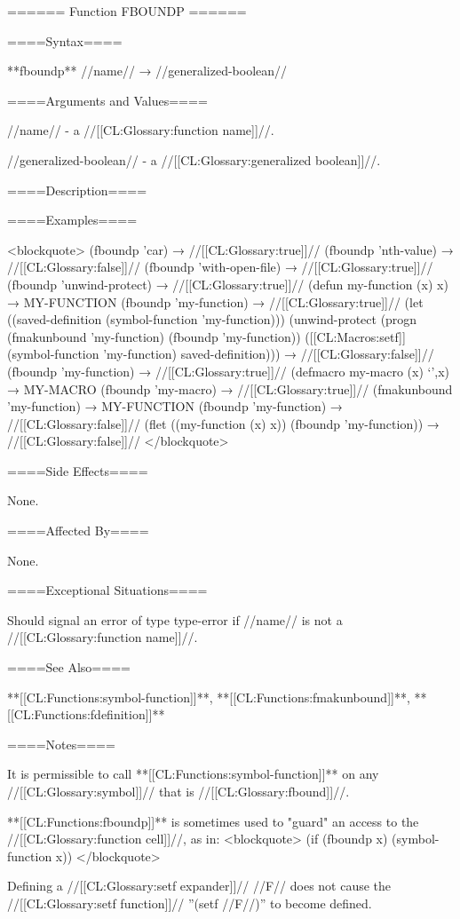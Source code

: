 ====== Function FBOUNDP ======

====Syntax====

**fboundp** //name// → //generalized-boolean//


====Arguments and Values====

//name// - a //[[CL:Glossary:function name]]//.

//generalized-boolean// - a //[[CL:Glossary:generalized boolean]]//.

====Description====


====Examples====

<blockquote> (fboundp 'car) → //[[CL:Glossary:true]]// (fboundp 'nth-value) → //[[CL:Glossary:false]]// (fboundp 'with-open-file) → //[[CL:Glossary:true]]// (fboundp 'unwind-protect) → //[[CL:Glossary:true]]// (defun my-function (x) x) → MY-FUNCTION (fboundp 'my-function) → //[[CL:Glossary:true]]// (let ((saved-definition (symbol-function 'my-function))) (unwind-protect (progn (fmakunbound 'my-function) (fboundp 'my-function)) ([[CL:Macros:setf]] (symbol-function 'my-function) saved-definition))) → //[[CL:Glossary:false]]// (fboundp 'my-function) → //[[CL:Glossary:true]]// (defmacro my-macro (x) `',x) → MY-MACRO (fboundp 'my-macro) → //[[CL:Glossary:true]]// (fmakunbound 'my-function) → MY-FUNCTION (fboundp 'my-function) → //[[CL:Glossary:false]]// (flet ((my-function (x) x)) (fboundp 'my-function)) → //[[CL:Glossary:false]]// </blockquote>

====Side Effects====

None.

====Affected By====

None.

====Exceptional Situations====

Should signal an error of type type-error if //name// is not a //[[CL:Glossary:function name]]//.

====See Also====

**[[CL:Functions:symbol-function]]**, **[[CL:Functions:fmakunbound]]**, **[[CL:Functions:fdefinition]]**

====Notes====

It is permissible to call **[[CL:Functions:symbol-function]]** on any //[[CL:Glossary:symbol]]// that is //[[CL:Glossary:fbound]]//.

**[[CL:Functions:fboundp]]** is sometimes used to "guard" an access to the //[[CL:Glossary:function cell]]//, as in: <blockquote> (if (fboundp x) (symbol-function x)) </blockquote>

Defining a //[[CL:Glossary:setf expander]]// //F// does not cause the //[[CL:Glossary:setf function]]// ''(setf //F//)'' to become defined.

 
